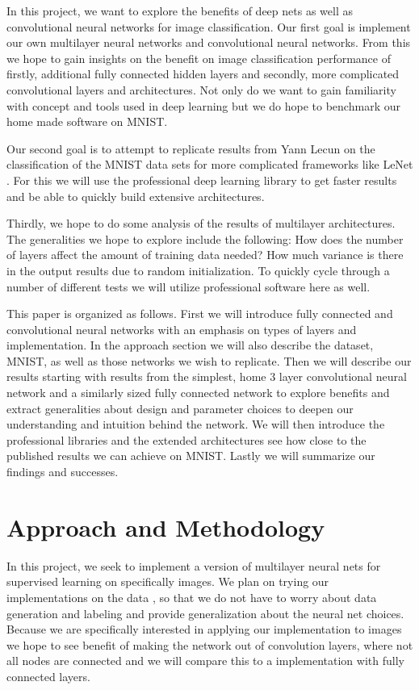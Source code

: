 \documentclass[12pt, twocolumn]{article}
\begin{document}
In this project, we want to explore the benefits of deep nets as well as convolutional neural networks for image classification.  Our first goal is implement our own multilayer neural networks and convolutional neural networks. From this we hope to gain insights on the benefit on image classification performance of firstly, additional fully connected hidden layers and secondly, more complicated convolutional layers and architectures.  Not only do we want to gain familiarity with concept and tools used in deep learning but we do hope to benchmark our home made software on MNIST. 

Our second goal is to attempt to replicate results from Yann Lecun on the classification of the MNIST data sets for more complicated frameworks like LeNet \cite{LeCun1998}. For this we will use the professional deep learning library to get faster results and be able to quickly build extensive architectures. 

Thirdly, we hope to do some analysis of the results of multilayer architectures. The generalities we hope to explore include the following: How does the number of layers affect the amount of training data needed?  How much variance is there in the output results due to random initialization.  To quickly cycle through a number of different tests we will utilize professional software here as well. 

This paper is organized as follows. First we will introduce fully connected and convolutional neural networks with an emphasis on types of layers and implementation. In the approach section we will also describe the dataset, MNIST, as well as those networks we wish to replicate.  Then we will describe our results starting with  results from the simplest, home  3 layer convolutional neural network and a similarly sized fully connected network to explore benefits and extract generalities about design and parameter choices to deepen our understanding and intuition behind the network. We will then introduce the professional libraries and the extended architectures see how close to the published results we can achieve on MNIST. Lastly we will summarize our findings and successes.

\section{Approach and Methodology}
	
In this project, we seek to implement a version of multilayer neural nets for supervised learning on specifically images. We plan on trying our implementations on the data , so that we do not have to worry about data generation and labeling and provide generalization about the neural net choices. Because we are specifically interested in applying our implementation to images we hope to see benefit of making the network out of convolution layers, where not all nodes are connected and we will compare this to a implementation with fully connected layers.
\end{document}
